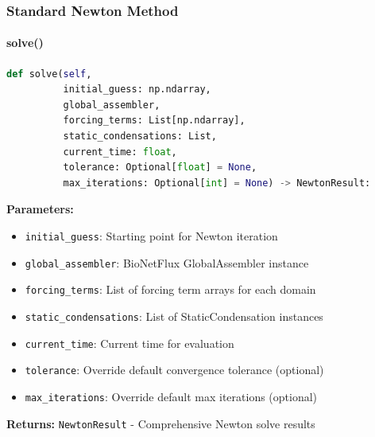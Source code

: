 \subsubsection{Standard Newton Method}

\paragraph{solve()}\leavevmode
\begin{lstlisting}[language=Python, caption=Standard Newton Solve Method]
def solve(self, 
          initial_guess: np.ndarray,
          global_assembler,
          forcing_terms: List[np.ndarray],
          static_condensations: List,
          current_time: float,
          tolerance: Optional[float] = None,
          max_iterations: Optional[int] = None) -> NewtonResult:
\end{lstlisting}

\textbf{Parameters:}
\begin{itemize}
    \item \texttt{initial\_guess}: Starting point for Newton iteration
    \item \texttt{global\_assembler}: BioNetFlux GlobalAssembler instance
    \item \texttt{forcing\_terms}: List of forcing term arrays for each domain
    \item \texttt{static\_condensations}: List of StaticCondensation instances
    \item \texttt{current\_time}: Current time for evaluation
    \item \texttt{tolerance}: Override default convergence tolerance (optional)
    \item \texttt{max\_iterations}: Override default max iterations (optional)
\end{itemize}

\textbf{Returns:} \texttt{NewtonResult} - Comprehensive Newton solve results

